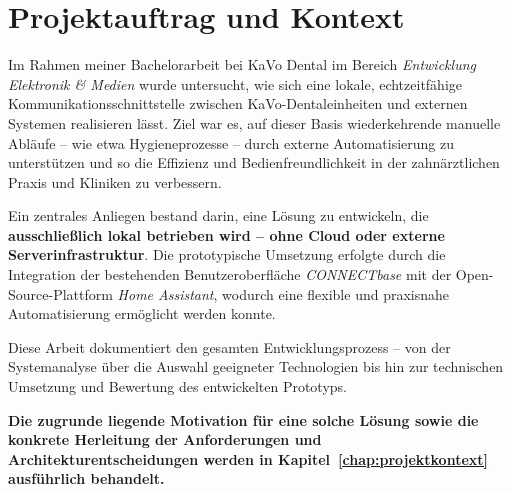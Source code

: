 \vspace{1em}


\section{Projektauftrag und Kontext}

Im Rahmen meiner Bachelorarbeit bei KaVo Dental im Bereich \textit{Entwicklung Elektronik \& Medien} wurde untersucht, wie sich eine lokale, echtzeitfähige Kommunikationsschnittstelle zwischen KaVo-Dentaleinheiten und externen Systemen realisieren lässt. Ziel war es, auf dieser Basis wiederkehrende manuelle Abläufe – wie etwa Hygieneprozesse – durch externe Automatisierung zu unterstützen und so die Effizienz und Bedienfreundlichkeit in der zahnärztlichen Praxis und Kliniken zu verbessern.

Ein zentrales Anliegen bestand darin, eine Lösung zu entwickeln, die \textbf{ausschließlich lokal betrieben wird – ohne Cloud oder externe Serverinfrastruktur}. Die prototypische Umsetzung erfolgte durch die Integration der bestehenden Benutzeroberfläche \textit{CONNECTbase} mit der Open-Source-Plattform \textit{Home Assistant}, wodurch eine flexible und praxisnahe Automatisierung ermöglicht werden konnte.

Diese Arbeit dokumentiert den gesamten Entwicklungsprozess – von der Systemanalyse über die Auswahl geeigneter Technologien bis hin zur technischen Umsetzung und Bewertung des entwickelten Prototyps.

\textbf{Die zugrunde liegende Motivation für eine solche Lösung sowie die konkrete Herleitung der Anforderungen und Architekturentscheidungen werden in Kapitel~\ref{chap:projektkontext} ausführlich behandelt.}

